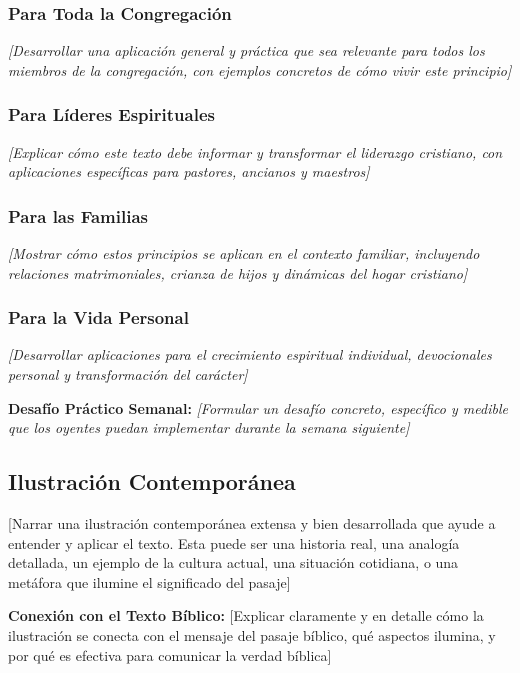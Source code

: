 \documentclass[12pt,a4paper]{article}
\newcommand{\aplicacion}[1]{\textcolor{sagegreen}{\textit{#1}}}
\begin{document}
\subsubsection{Para Toda la Congregación}
\aplicacion{[Desarrollar una aplicación general y práctica que sea relevante para todos los miembros de la congregación, con ejemplos concretos de cómo vivir este principio]}

\subsubsection{Para Líderes Espirituales}
\aplicacion{[Explicar cómo este texto debe informar y transformar el liderazgo cristiano, con aplicaciones específicas para pastores, ancianos y maestros]}

\subsubsection{Para las Familias}
\aplicacion{[Mostrar cómo estos principios se aplican en el contexto familiar, incluyendo relaciones matrimoniales, crianza de hijos y dinámicas del hogar cristiano]}

\subsubsection{Para la Vida Personal}
\aplicacion{[Desarrollar aplicaciones para el crecimiento espiritual individual, devocionales personal y transformación del carácter]}

\begin{mdframed}[style=AlertBox]
\textbf{Desafío Práctico Semanal:}
\aplicacion{[Formular un desafío concreto, específico y medible que los oyentes puedan implementar durante la semana siguiente]}
\end{mdframed}

\subsection{Ilustración Contemporánea}

[Narrar una ilustración contemporánea extensa y bien desarrollada que ayude a entender y aplicar el texto. Esta puede ser una historia real, una analogía detallada, un ejemplo de la cultura actual, una situación cotidiana, o una metáfora que ilumine el significado del pasaje]

\begin{mdframed}[style=InfoBox]
\textbf{Conexión con el Texto Bíblico:}
[Explicar claramente y en detalle cómo la ilustración se conecta con el mensaje del pasaje bíblico, qué aspectos ilumina, y por qué es efectiva para comunicar la verdad bíblica]
\end{mdframed}
\end{document}
